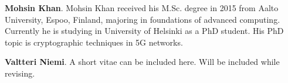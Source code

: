 \documentclass{river-journal}
\begin{document}
\medskip
\noindent
{\bf Mohsin Khan}. Mohsin Khan received his M.Sc. degree in 2015 from Aalto University, Espoo, Finland, majoring in foundations of advanced computing. Currently he is studying in University of Helsinki as a PhD student. His PhD topic is cryptographic techniques in 5G networks.




\medskip
\noindent
{\bf Valtteri Niemi}. A short vitae can be included here. Will be included while revising.
\end{document}

